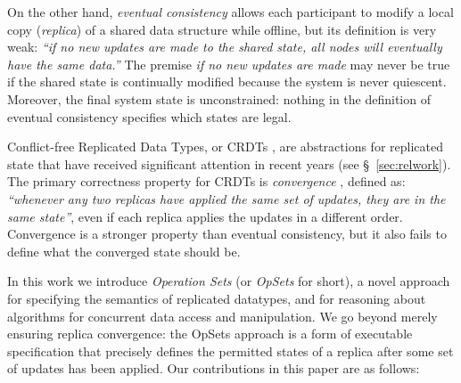 \documentclass[a4paper,english]{lipics-v2018}
\begin{document}
On the other hand, \emph{eventual consistency} \cite{Bailis:2013jc,Burckhardt:2014hy,Terry:1994fp,Vogels:2009ca} allows each participant to modify a local copy (\emph{replica}) of a shared data structure while offline, but its definition is very weak: \emph{``if no new updates are made to the shared state, all nodes will eventually have the same data.''}
The premise \emph{if no new updates are made} may never be true if the shared state is continually modified because the system is never quiescent.
Moreover, the final system state is unconstrained: nothing in the definition of eventual consistency specifies which states are legal.

Conflict-free Replicated Data Types, or CRDTs \cite{Shapiro:2011wy,Shapiro:2011un}, are abstractions for replicated state that have received significant attention in recent years (see \S~\ref{sec:relwork}).
The primary correctness property for CRDTs is \emph{convergence} \cite{Shapiro:2011un,Gomes:2017gy}, defined as: \emph{``whenever any two replicas have applied the same set of updates, they are in the same state''}, even if each replica applies the updates in a different order.
Convergence is a stronger property than eventual consistency, but it also fails to define what the converged state should be.

In this work we introduce \emph{Operation Sets} (or \emph{OpSets} for short), a novel approach for specifying the semantics of replicated datatypes, and for reasoning about algorithms for concurrent data access and manipulation.
We go beyond merely ensuring replica convergence: the OpSets approach is a form of executable specification that precisely defines the permitted states of a replica after some set of updates has been applied.
Our contributions in this paper are as follows:
\end{document}

